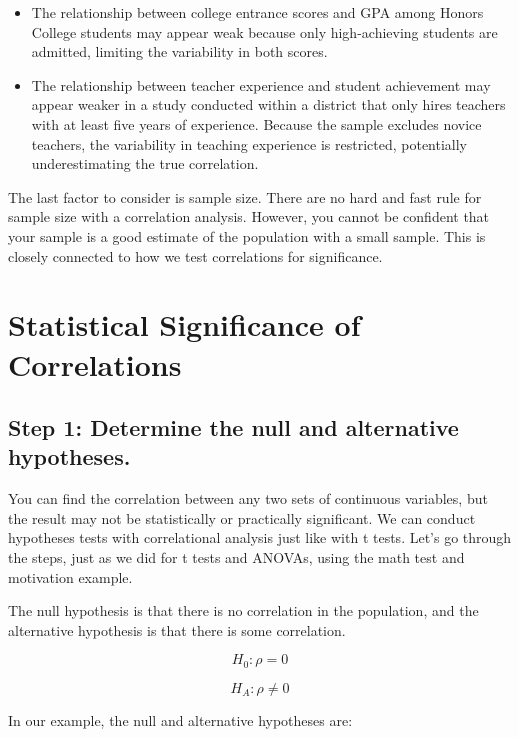 \documentclass[
  letterpaper,
  DIV=11,
  numbers=noendperiod]{scrreprt}
\begin{document}
\begin{itemize}
\item
  The relationship between college entrance scores and GPA among Honors
  College students may appear weak because only high-achieving students
  are admitted, limiting the variability in both scores.
\item
  The relationship between teacher experience and student achievement
  may appear weaker in a study conducted within a district that only
  hires teachers with at least five years of experience. Because the
  sample excludes novice teachers, the variability in teaching
  experience is restricted, potentially underestimating the true
  correlation.
\end{itemize}

The last factor to consider is sample size. There are no hard and fast
rule for sample size with a correlation analysis. However, you cannot be
confident that your sample is a good estimate of the population with a
small sample. This is closely connected to how we test correlations for
significance.

\section{Statistical Significance of
Correlations}\label{statistical-significance-of-correlations}

\subsection*{Step 1: Determine the null and alternative
hypotheses.\,}\label{step-1-determine-the-null-and-alternative-hypotheses.-4}

You can find the correlation between any two sets of continuous
variables, but the result may not be statistically or practically
significant. We can conduct hypotheses tests with correlational analysis
just like with t tests. Let's go through the steps, just as we did for t
tests and ANOVAs, using the math test and motivation example.

The null hypothesis is that there is no correlation in the population,
and the alternative hypothesis is that there is some correlation.

\[
H_0: ρ = 0 
\]

\[
H_A: ρ \ne 0
\]

In our example, the null and alternative hypotheses are:
\end{document}
